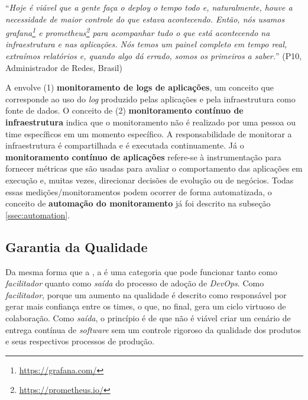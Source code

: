 \begin{mq}
``\emph{Hoje é viável que a gente faça o deploy o tempo todo e, naturalmente,
houve a necessidade de maior controle do que estava acontecendo. Então, nós
usamos grafana\footnote{\url{https://grafana.com/}} e prometheus\footnote{\url{https://prometheus.io/}}
para acompanhar tudo o que está acontecendo na infraestrutura e nas aplicações.
Nós temos um painel completo em tempo real, extraímos relatórios e, quando algo
dá errado, somos os primeiros a saber.}''
(P10, Administrador de Redes, Brasil)
\end{mq}

A  envolve (1) {\bf monitoramento de logs de aplicações},
um conceito que corresponde ao uso do {\it log} produzido pelas aplicações e pela
infraestrutura como fonte de dados. O conceito de (2) {\bf monitoramento
contínuo de infraestrutura} indica que o monitoramento não é realizado por uma
pessoa ou time específicos em um momento específico. A responsabilidade de
monitorar a infraestrutura é compartilhada e é executada continuamente.
Já o {\bf monitoramento contínuo de aplicações} refere-se à instrumentação para
fornecer métricas que são usadas para avaliar o comportamento das aplicações em
execução e, muitas vezes, direcionar decisões de evolução ou de negócios. Todas
essas medições/monitoramentos podem ocorrer de forma automatizada, o conceito de
{\bf automação do monitoramento} já foi descrito na subseção \ref{ssec:automation}.


\subsection{Garantia da Qualidade}

Da mesma forma que a , a  é
uma categoria que pode funcionar tanto como \emph{facilitador} quanto como \emph{saída}
do processo de adoção de {\it DevOps}. Como \emph{facilitador}, porque um aumento na
qualidade é descrito como responsável por gerar mais confiança entre os times,
o que, no final, gera um ciclo virtuoso de colaboração. Como \emph{saída}, o
princípio é de que não é viável criar um cenário de entrega contínua de {\it software}
sem um controle rigoroso da qualidade dos produtos e seus respectivos processos
de produção.

